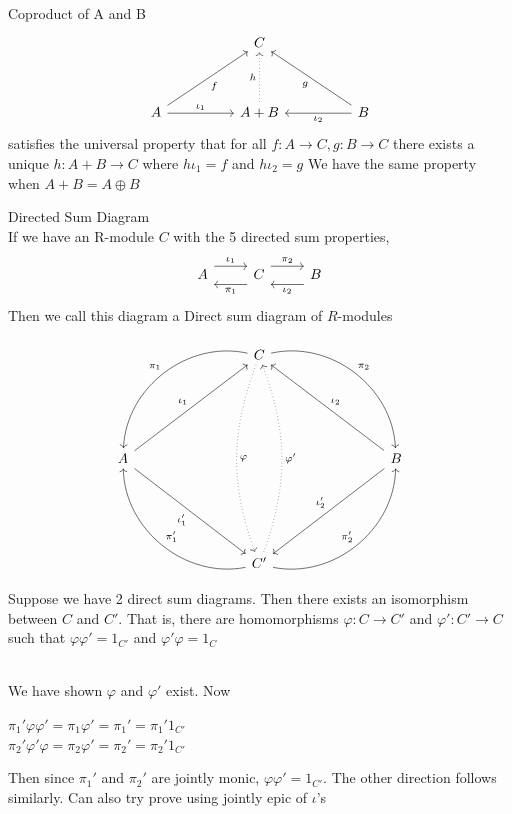 \documentclass{report}
\begin{document}
\begin{definition}{Coproduct of A and B}{}\\

\[
\begin{tikzcd}[column sep=huge, row sep=huge]
& C & \\ A \arrow[r, "\iota _1"] \arrow[ur, "f"'] & A+B \arrow[u, dotted, "h"] & B \arrow[l, "\iota _2"] \arrow[ul, "g"]
\end{tikzcd}
\]
satisfies the universal property that for all $f: A \to C, g:B \to C$ there exists a unique $h:A+B \to C$ where $h \iota _1=f$ and $h\iota _2 = g$
We have the same property when $A+B=A \oplus B$
    
\end{definition}

\begin{definition}{Directed Sum Diagram}{}\\
If we have an R-module $C$ with the 5 directed sum properties, 
\[
\begin{tikzcd}
A \arrow[r, shift left=1.5ex, "\iota_1"] & C \arrow[l, shift left=1.5ex, "\pi_1"] \arrow[r, shift left=1.5ex, "\pi_2"] & B \arrow[l, shift left=1.5ex, "\iota_2"]
\end{tikzcd}
\]
Then we call this diagram a Direct sum diagram of $R$-modules
\end{definition}

\begin{thm}{}{}

\[
\begin{tikzcd}[row sep=6em, column sep=8em]
 &
C \arrow[dl, bend right=50, "\pi _1"'] \arrow[dr, bend left=50, "\pi _2"] \arrow[dd, dotted, bend right = 20, "\varphi"] & \\
A \arrow[ur,  "\iota_1"] \arrow[dr, "\iota _1'"'] & & B \arrow[ul, "\iota _2"'] \arrow[dl,  "\iota _2 '"'] \\ & C' \arrow[ul, bend left=50, "\pi _1 '"'] \arrow[ur, bend right=50, "\pi _2 '"] \arrow[uu, dotted, bend right = 20, "\varphi '"'] 
\end{tikzcd}
\]
Suppose we have 2 direct sum diagrams. Then there exists an isomorphism between $C$ and $C'$. That is, there are homomorphisms $\varphi :C \to C'$ and $\varphi ':C'\to C$ such that $\varphi \varphi ' = 1_{C'}$ and $\varphi ' \varphi =1_C$
\end{thm}

\begin{prf}{}{}\\
We have shown $\varphi $ and $\varphi ' $ exist. Now
\begin{center}
    $\pi _1 ' \varphi \varphi ' = \pi _1 \varphi '=\pi _1'=\pi _1' 1_{C'}$ \\ 
    $\pi _2 ' \varphi' \varphi  = \pi _2 \varphi '=\pi _2'=\pi _2' 1_{C'}$
\end{center}
Then since $\pi _1'$ and $\pi _2'$ are jointly monic, $\varphi \varphi ' = 1_{C'}$. The other direction follows similarly. Can also try prove using jointly epic of $\iota $'s
    
\end{prf}
\end{document}
